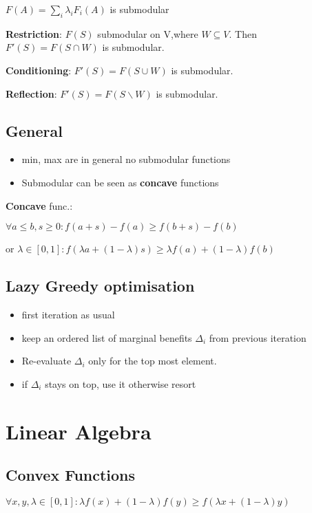 \documentclass[a4paper,11pt,twocolumn]{article}
\begin{document}
$F(A) = \sum_i \lambda_i F_i(A)$ is submodular 

\textbf{Restriction}: $F(S)$ submodular on V,where $W \subseteq V$. Then $F'(S) = F(S \cap W)$ is submodular.

\textbf{Conditioning}: $F'(S) = F(S \cup W)$ is submodular.

\textbf{Reflection}: $F'(S) = F(S \backslash W)$ is submodular.

\subsection{General}
\begin{itemize}[noitemsep,topsep=0pt,parsep=0pt,partopsep=0pt]
\item min, max are in general no submodular functions
\item Submodular can be seen as \textbf{concave} functions
\end{itemize} 

\textbf{Concave} func.: 

$\forall a \leq b, s \geq 0 : f(a+s)- f(a) \geq f(b+s) -f(b)$

or $\lambda \in [0,1]: f(\lambda a+ (1-\lambda)s) \geq \lambda f(a) + (1-\lambda) f(b)$

\subsection{Lazy Greedy optimisation}
\begin{itemize}[noitemsep,topsep=0pt,parsep=0pt,partopsep=0pt]
\item first iteration as usual
\item keep an ordered list of marginal benefits $\Delta_i$ from previous iteration
\item 	Re-evaluate $\Delta_i$ only for the top most element.
\item if $\Delta_i$ stays on top, use it otherwise resort
\end{itemize}



\section{Linear Algebra}

\subsection{Convex Functions}
$\forall x,y, \lambda \in [0,1] : \lambda f(x) + (1-\lambda)f(y) \geq f(\lambda x +  (1-\lambda) y)$
\end{document}
